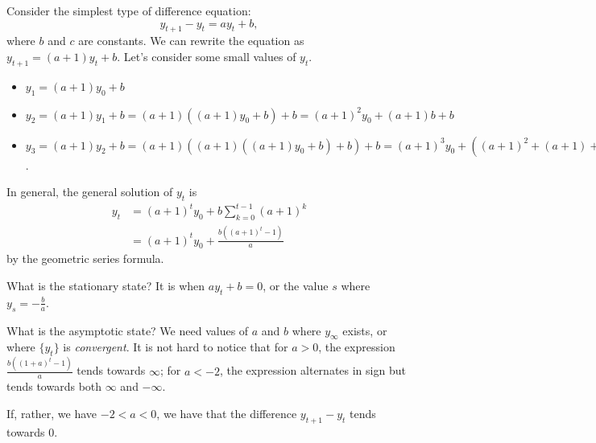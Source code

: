 \documentclass[a4paper, 12pt,oneside,openany]{book}
\begin{document}

Consider the simplest type of difference equation: $$y_{t+1}-y_t=ay_t+b,$$ where $b$ and $c$ are constants. We can rewrite the equation as $y_{t+1} = (a+1)y_t+b.$ Let's consider some small values of $y_t$.

\begin{itemize}
	\item $y_1 = (a+1)y_0+b$
	\item $y_2= (a+1)y_1+b = (a+1)((a+1)y_0+b)+b = (a+1)^2y_0 + (a+1)b+b$
	\item $y_3 = (a+1)y_2+b = (a+1)((a+1)((a+1)y_0+b)+b)+b = (a+1)^3y_0 + ((a+1)^2+(a+1)+1)b$.
\end{itemize}

In general, the general solution of $y_t$ is \begin{align*}y_t&= (a+1)^t y_0+ b\sum\limits_{k=0}^{t-1} (a+1)^k\\ &= (a+1)^t y_0+ \frac{b((a+1)^t-1)}{a}\end{align*} by the geometric series formula.

What is the stationary state? It is when $ay_t+b=0$, or the value $s$ where $y_s = -\frac{b}{a}$.

What is the asymptotic state? We need values of $a$ and $b$ where $y_\infty$ exists, or where $\{y_t\}$ is \emph{convergent}. It is not hard to notice that for $a>0$, the expression $\frac{b((1+a)^t-1)}{a}$ tends towards $\infty$; for $a<-2$, the expression alternates in sign but tends towards both $\infty$ and $-\infty$. 

If, rather, we have $-2 < a < 0$, we have that the difference $y_{t+1}-y_t$ tends towards 0. 
\end{document}
